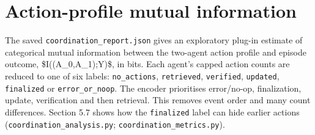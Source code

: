 \documentclass[12pt,a4paper,oneside]{report}
\begin{document}
\section{Action-profile mutual information}
The saved \texttt{coordination\allowbreak\_report.json} gives an exploratory plug-in estimate of categorical mutual information between the two-agent action profile and episode outcome, \$I((A\allowbreak\_0,A\allowbreak\_1);Y)\$, in bits. Each agent’s capped action counts are reduced to one of six labels: \texttt{no\allowbreak\_actions}, \texttt{retrieved}, \texttt{verified}, \texttt{updated}, \texttt{finalized} or \texttt{error\allowbreak\_or\allowbreak\_noop}. The encoder prioritises error/no-op, finalization, update, verification and then retrieval. This removes event order and many count differences. Section 5.7 shows how the \texttt{finalized} label can hide earlier actions (\texttt{coordination\allowbreak\_analysis.py}; \texttt{coordination\allowbreak\_metrics.py}).
\end{document}
